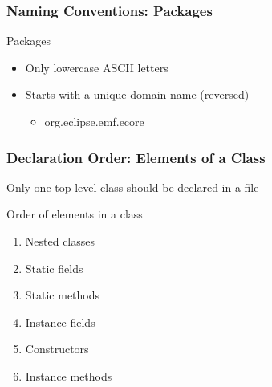 \documentclass[screen]{beamer}
\begin{document}
\begin{frame}[fragile]
\frametitle{Naming Conventions: Packages}%
%
\begin{block}{Packages}
	\begin{itemize}
		\item Only lowercase ASCII letters
		\item Starts with a unique domain name (reversed)
			\begin{itemize}
				\item org.eclipse.emf.ecore
			\end{itemize}
	\end{itemize}
\end{block}
\end{frame}
\begin{frame}[fragile]
\frametitle{Declaration Order: Elements of a Class}%
%
\begin{block}{Only one top-level class should be declared in a file}
\end{block}
\begin{block}{Order of elements in a class}
	\begin{enumerate}
		\item Nested classes
		\item Static fields
		\item Static methods
		\item Instance fields
		\item Constructors
		\item Instance methods
	\end{enumerate}
\end{block}
\end{frame}
\end{document}
